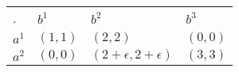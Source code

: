\begin{center}
    \begin{tabular}{llll}
    .                          & $b^1$    & $b^2$                      & $b^3$                           \\ \cline{2-4}
    \multicolumn{1}{l|}{$a^1$} & $(1, 1)$ & $(2, 2)$                   & \multicolumn{1}{l|}{$(0, 0)$} \\
    \multicolumn{1}{l|}{$a^2$} & $(0, 0)$ & $(2+\epsilon, 2+\epsilon)$ & \multicolumn{1}{l|}{$(3, 3)$} \\ \cline{2-4}
    \end{tabular}
\end{center}